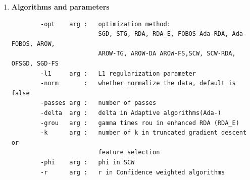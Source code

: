 \documentclass[11pt,a4paper]{article}
\newlength{\wideitemsep}
\let\olditem\item
\renewcommand{\item}{\setlength{\itemsep}{\wideitemsep}\olditem}
\begin{document}
\begin{enumerate}
    \item \textbf{Algorithms and parameters}
        \begin{lstlisting}
        -opt    arg :   optimization method: 
                        SGD, STG, RDA, RDA_E, FOBOS Ada-RDA, Ada-FOBOS, AROW, 
                        AROW-TG, AROW-DA AROW-FS,SCW, SCW-RDA, OFSGD, SGD-FS
        -l1     arg :   L1 regularization parameter
        -norm       :   whether normalize the data, default is false
        -passes arg :   number of passes 
        -delta  arg :   delta in Adaptive algorithms(Ada-)
        -grou   arg :   gamma times rou in enhanced RDA (RDA_E)
        -k      arg :   number of k in truncated gradient descent or 
                        feature selection
        -phi    arg :   phi in SCW
        -r      arg :   r in Confidence weighted algorithms
        \end{lstlisting}


\end{enumerate}
\end{document}
